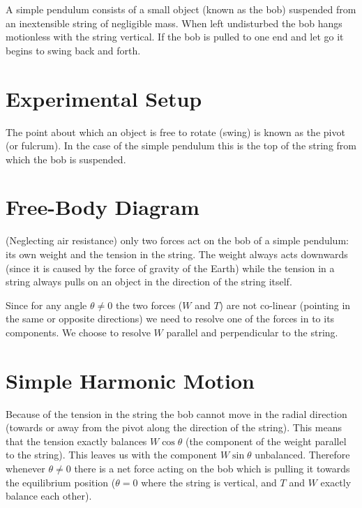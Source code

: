 A simple pendulum consists of a small object (known as the bob) suspended from an inextensible string of negligible mass. When left undisturbed the bob hangs motionless with the string vertical. If the bob is pulled to one end and let go it begins to swing back and forth.

\section{Experimental Setup}

   

   The point about which an object is free to rotate (swing) is known as the pivot (or fulcrum). In the case of the simple pendulum this is the top of the string from which the bob is suspended.

\section{Free-Body Diagram}

   (Neglecting air resistance) only two forces act on the bob of a simple pendulum: its own weight and the tension in the string. The weight always acts downwards (since it is caused by the force of gravity of the Earth) while the tension in a string always pulls on an object in the direction of the string itself.

   

   Since for any angle $\theta \neq 0$ the two forces ($W$ and $T$) are not co-linear (pointing in the same or opposite directions) we need to resolve one of the forces in to its components. We choose to resolve $W$ parallel and perpendicular to the string.

   \diag %

\section{Simple Harmonic Motion}

   Because of the tension in the string the bob cannot move in the radial direction (towards or away from the pivot along the direction of the string). This means that the tension exactly balances $W \cos \theta$ (the component of the weight parallel to the string). This leaves us with the component $W \sin \theta$ unbalanced. Therefore whenever $\theta \neq 0$ there is a net force acting on the bob which is pulling it towards the equilibrium position ($\theta = 0$ where the string is vertical, and $T$ and $W$ exactly balance each other).

